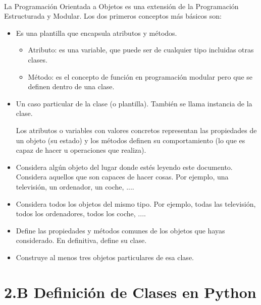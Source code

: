 


\

La Programación Orientada a Objetos es una extensión de la Programación Estructurada y Modular. Los dos primeros conceptos más básicos son:
\begin{itemize}
\item {} Es una plantilla que encapsula atributos y métodos.
	\begin{itemize}
	\item Atributo: es una variable, que puede ser de cualquier tipo incluidas otras clases.  
	\item Método: es el concepto de función en programación modular pero que se definen dentro de una clase.
	\end{itemize}
\item {} Un caso particular de la clase (o plantilla). También se llama instancia de la clase.

Los atributos o variables con valores concretos representan las propiedades de un objeto (su estado) y los métodos definen su comportamiento (lo que es capaz de hacer u operaciones que realiza).
\end{itemize}




\begin{ejercicio}\mbox{}
\begin{itemize}
\item 
Considera algún objeto del lugar donde estés leyendo este documento. Considera aquellos que son capaces de hacer cosas. Por ejemplo, una televisión, un ordenador, un coche, .... 

\item
Considera todos los objetos del mismo tipo. Por ejemplo, todas las televisión, todos los ordenadores, todos los coche, .... 

\item
Define las propiedades y métodos comunes de los objetos que hayas considerado. En definitiva, define su clase.

\item
Construye al menos tres objetos particulares de esa clase.
\end{itemize}
\end{ejercicio}




\section*{2.B Definición de Clases en Python} 




